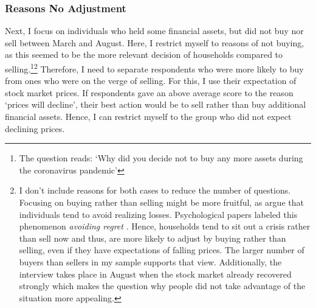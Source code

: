 \documentclass[ProjectABM]{subfiles}
\begin{document}
\subsubsection{Reasons No Adjustment}
Next, I focus on individuals who held some financial assets, but did not buy nor sell between March and August. Here, I restrict myself to reasons of not buying, as this seemed to be the more relevant decision of households compared to selling.\footnote{The question reads: `Why did you decide not to buy any more assets during the coronavirus pandemic'}\footnote{I don't include reasons for both cases to reduce the number of questions. Focusing on buying rather than selling might be more fruitful, as \cite{Kahneman_Tversky1979_Prospect} argue that individuals tend to avoid realizing losses. Psychological papers labeled this phenomenon \textit{avoiding regret} \citep{anderson2003_psychology}. Hence, households tend to sit out a crisis rather than sell now and thus, are more likely to adjust by buying rather than selling, even if they have expectations of falling prices. The larger number of buyers than sellers in my sample supports that view. Additionally, the interview takes place in August when the stock market already recovered strongly which makes the question why people did not take advantage of the situation more appealing.} 
Therefore, I need to separate respondents who were more likely to buy from ones who were on the verge of selling. For this, I use their expectation of stock market prices. If respondents gave an above average score to the reason `prices will decline', their best action would be to sell rather than buy additional financial assets. Hence, I can restrict myself to the group who did not expect declining prices. 


%
\end{document}
